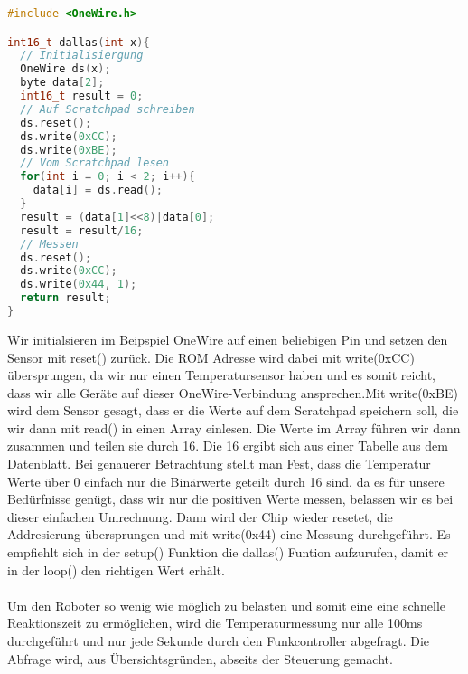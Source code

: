 \documentclass[12pt]{article}
\begin{document}
\begin{file}[DS18B20]	
        \begin{lstlisting}[language=C++, inputencoding={utf8}, extendedchars=false]        
#include <OneWire.h>

int16_t dallas(int x){
  // Initialisiergung
  OneWire ds(x); 
  byte data[2];
  int16_t result = 0;
  // Auf Scratchpad schreiben
  ds.reset(); 
  ds.write(0xCC);
  ds.write(0xBE); 
  // Vom Scratchpad lesen
  for(int i = 0; i < 2; i++){
    data[i] = ds.read();
  } 
  result = (data[1]<<8)|data[0];
  result = result/16;
  // Messen
  ds.reset();
  ds.write(0xCC);  
  ds.write(0x44, 1);
  return result;
}
        \end{lstlisting}
        
\end{file}
Wir initialsieren im Beipspiel OneWire auf einen beliebigen Pin und setzen den Sensor mit reset() zurück. Die ROM Adresse wird dabei mit write(0xCC) übersprungen, da wir nur einen Temperatursensor haben und es somit reicht, dass wir alle Geräte auf dieser OneWire-Verbindung ansprechen.Mit write(0xBE) wird dem Sensor gesagt, dass er die Werte auf dem Scratchpad speichern soll, die wir dann mit read() in einen Array einlesen. Die Werte im Array führen wir dann zusammen und teilen sie durch 16. Die 16 ergibt sich aus einer Tabelle aus dem Datenblatt. Bei genauerer Betrachtung stellt man Fest, dass die Temperatur Werte über 0 einfach nur die Binärwerte geteilt durch 16 sind. da es für unsere Bedürfnisse genügt, dass wir nur die positiven Werte messen, belassen wir es bei dieser einfachen Umrechnung. Dann wird der Chip wieder resetet, die Addresierung übersprungen  und mit write(0x44) eine Messung durchgeführt. Es empfiehlt sich in der setup() Funktion die dallas() Funtion aufzurufen, damit er in der loop() den richtigen Wert erhält.\\
\\   
Um den Roboter so wenig wie möglich zu belasten und somit eine eine schnelle Reaktionszeit zu ermöglichen, wird die Temperaturmessung nur alle 100ms durchgeführt und nur jede Sekunde durch den Funkcontroller abgefragt. Die Abfrage wird, aus Übersichtsgründen, abseits der Steuerung gemacht.

\newpage
\end{document}
